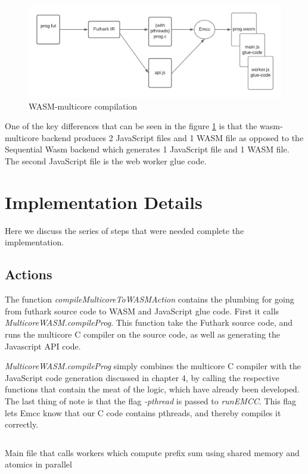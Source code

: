 \documentclass[11pt]{book}
\begin{document}
\begin{figure}[htbp]
\centerline{\includegraphics[width=\textwidth]{figures/WASM_MC_compiler.png}}
    \caption{WASM-multicore compilation}
\label{fig:wasm-mc}
\end{figure}
One of the key differences that can be seen in the figure \ref{fig:wasm-mc} is that the wasm-multicore backend produces 2 JavaScript files and 1 WASM file as opposed to the Sequential Wasm backend which generates 1 JavaScript file and 1 WASM file. The second JavaScript file is the web worker glue code.

\section{Implementation Details}
Here we discuss the series of steps that were needed complete the implementation.
\subsection{Actions}

The function \textit{compileMulticoreToWASMAction} contains the plumbing for going from futhark source code to WASM and JavaScript glue code. First it calls \textit{MulticoreWASM.compileProg}. This function take the Futhark source code, and runs the multicore C compiler on the source code, as well as generating the Javascript API code.

\textit{MulticoreWASM.compileProg} simply combines the multicore C compiler with the JavaScript code generation discussed in chapter 4, by calling the respective functions that contain the meat of the logic, which have already been developed. The last thing of note is that the flag \textit{-pthread} is passed to \textit{runEMCC}. This flag lets Emcc know that our C code contains pthreads, and thereby compiles it correctly.


\begin{listing}[H]    
        \inputminted[fontsize=\small,baselinestretch=0.5,linenos,breaklines]{haskell}{code/actionmc.hs}
        \caption{Main file that calls workers which compute prefix sum using shared memory and atomics in parallel}    
        \label{lst:action-mc}    
\end{listing}    
\end{document}
